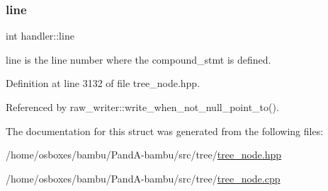 \subsubsection{\texorpdfstring{line}{line}}
{\footnotesize\ttfamily int handler\+::line}



line is the line number where the compound\+\_\+stmt is defined. 



Definition at line 3132 of file tree\+\_\+node.\+hpp.



Referenced by raw\+\_\+writer\+::write\+\_\+when\+\_\+not\+\_\+null\+\_\+point\+\_\+to().



The documentation for this struct was generated from the following files\+:\begin{DoxyCompactItemize}
\item 
/home/osboxes/bambu/\+Pand\+A-\/bambu/src/tree/\hyperlink{tree__node_8hpp}{tree\+\_\+node.\+hpp}\item 
/home/osboxes/bambu/\+Pand\+A-\/bambu/src/tree/\hyperlink{tree__node_8cpp}{tree\+\_\+node.\+cpp}\end{DoxyCompactItemize}
